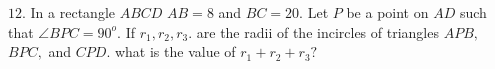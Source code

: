 $12.$ In a rectangle $ABCD$ $AB=8$ and $BC=20.$ Let $P$ be a point on $AD$ such that $\angle{BPC}=90^o.$ If $r_1,r_2,r_3.$  are the radii of the incircles of triangles $APB,$ $BPC,$ and $CPD.$ what is the value of $r_1+r_2+r_3 ?$
